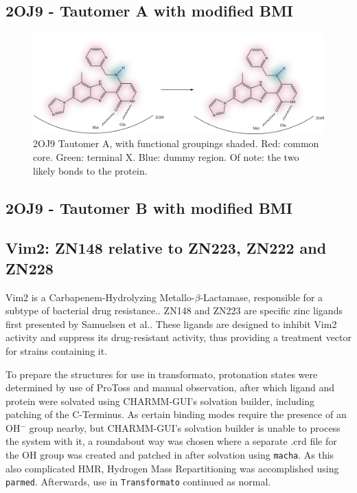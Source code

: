\documentclass[oneside]{scrreprt}
\begin{document}
\subsection{2OJ9 - Tautomer A with modified BMI}
\begin{figure}[H]
    \centering
    \includegraphics[width=\textwidth]{taapdb24to25.png}
    \caption{2OJ9 Tautomer A, with functional groupings shaded. Red: common core. Green: terminal X. Blue: dummy region. Of note: the two likely bonds to the protein.}
    \label{fig:2oj9_struc_taapdb}
\end{figure}
\subsection{2OJ9 - Tautomer B with modified BMI}
\subsection{Vim2: ZN148 relative to ZN223, ZN222 and ZN228}
Vim2 is a Carbapenem-Hydrolyzing Metallo-$\beta$-Lactamase, responsible for a subtype of bacterial drug resistance.\cite{Poirel2000Apr}. ZN148 and ZN223 are specific zinc ligands first presented by Samuelsen et al.\cite{Samuelsen2020Jun}. These ligands are designed to inhibit Vim2 activity and suppress its drug-resistant activity, thus providing a treatment vector for strains containing it. 

To prepare the structures for use in transformato, protonation states were determined by use of ProToss\cite{Lippert2009Dec,Bietz2014Dec} and manual observation, after which ligand and protein were solvated using CHARMM-GUI's solvation builder, including patching of the C-Terminus. As certain binding modes require the presence of an OH$^-$ group nearby, but CHARMM-GUI's solvation builder is unable to process the system with it, a roundabout way was chosen where a separate .crd file for the OH group was created and patched in after solvation using \texttt{macha}\cite{twotoneblue2022May}. As this also complicated HMR, Hydrogen Mass Repartitioning was accomplished using \texttt{parmed}\cite{Shirts2016Sep}. Afterwards, use in \texttt{Transformato} continued as normal.
\end{document}
